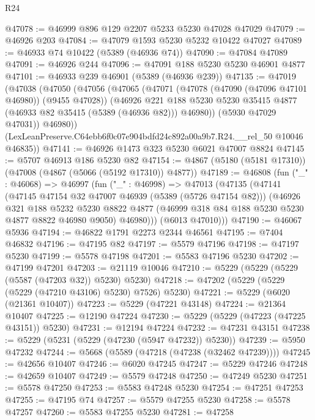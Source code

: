 \begin{lexlean}{R24}
\begin{coremodule}
@47078 := @46999 @896 @129 @2207 @5233 @5230 @47028 @47029
@47079 := @46926 @203
@47084 := @47079 @1593 @5230 @5232 @10422 @47027
@47089 := @46933 @74 @10422 (@5389 (@46936 @74))
@47090 := @47084 @47089
@47091 := @46926 @244
@47096 := @47091 @188 @5230 @5230 @46901 @4877
@47101 := @46933 @239 @46901 (@5389 (@46936 @239))
@47135 := @47019
    (@47038
      (@47050
        (@47056
          (@47065
            (@47071
              (@47078 (@47090 (@47096 @47101 @46980)) (@9455 @47028))
              (@46926
                @221
                @188
                @5230
                @5230
                @35415
                @4877
                (@46933 @82 @35415 (@5389 (@46936 @82)))
                @46980))
            (@5930 @47029 @47031))
          @46980))
      (LexLeanPreserve.C64ebb6f0c07e904bdfd24c892a00a9b7.R24.__rel_50 @10046 @46835))
@47141 := @46926 @1473 @323 @5230 @6021 @47007 @8824
@47145 := @5707 @46913 @186 @5230 @82
@47154 := @4867 (@5180 (@5181 @17310)) (@47008 (@4867 (@5066 (@5192 @17310)) @4877))
@47189 := @46808
    (fun ("_" : @46068) =>
    @46997
      (fun ("_" : @46998) =>
      @47013
        (@47135
          (@47141
            (@47145 @47154 @32 @47007 @46939 (@5389 (@5726 @47154 @82)))
            (@46926
              @321
              @188
              @5232
              @5230
              @8822
              @4877
              (@46999 @318 @84 @188 @5230 @5230 @4877 @8822 @46980 @9050)
              @46980)))
        (@6013 @47010)))
@47190 := @46067 @5936
@47194 := @46822 @1791 @2273 @2344 @46561
@47195 := @7404 @46832
@47196 := @47195 @82
@47197 := @5579 @47196
@47198 := @47197 @5230
@47199 := @5578 @47198
@47201 := @5583 @47196 @5230
@47202 := @47199 @47201
@47203 := @21119 @10046
@47210 := @5229 (@5229 (@5229 (@5587 (@47203 @32)) @5230) @5230)
@47218 := @47202 (@5229 (@5229 (@5229 (@47210 @43106) @5230) @7526) @5230)
@47221 := @5229 (@6020 (@21361 @10407))
@47223 := @5229 (@47221 @43148)
@47224 := @21364 @10407
@47225 := @12190 @47224
@47230 := @5229 (@5229 (@47223 (@47225 @43151)) @5230)
@47231 := @12194 @47224
@47232 := @47231 @43151
@47238 := @5229 (@5231 (@5229 (@47230 (@5947 @47232)) @5230))
@47239 := @5950 @47232
@47244 := @5668 (@5589 (@47218 (@47238 (@32462 @47239))))
@47245 := @42656 @10407
@47246 := @6020 @47245
@47247 := @5229 @47246
@47248 := @42659 @10407
@47249 := @5579 @47248
@47250 := @47249 @5230
@47251 := @5578 @47250
@47253 := @5583 @47248 @5230
@47254 := @47251 @47253
@47255 := @47195 @74
@47257 := @5579 @47255 @5230
@47258 := @5578 @47257
@47260 := @5583 @47255 @5230
@47281 := @47258

\end{coremodule}
\end{lexlean}
